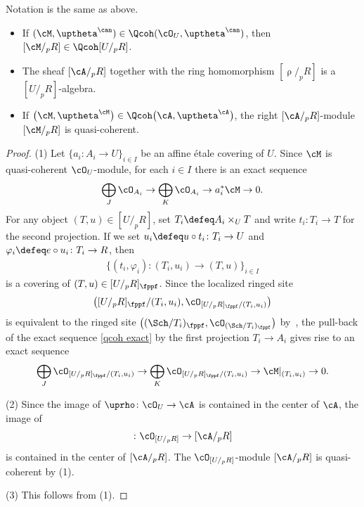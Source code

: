 \begin{lem}\label{qcoh qcoh} Notation is the same as above.
\begin{itemize}\itemsep=0pt
\item[$1.$] If $(\cM,\uptheta^{\can})\in \Qcoh(\cO_U,\uptheta^{\can})$, then $[\cM/_pR]\in \Qcoh[U/_pR]$.
\item[$2.$] The sheaf $[\cA/_pR]$ together with the ring homomorphism $[\uprho/_pR]$ is a $[U/_pR]$-algebra.
\item[$3.$] If $\big(\cM,\uptheta^{\cM}\big)\in \Qcoh\big(\cA,\uptheta^{\cA}\big)$, the right $[\cA/_pR]$-module $[\cM/_pR]$ is quasi-coherent.
\end{itemize}
\begin{proof}
(1) Let $\{a_i\colon A_i\to U\}_{i\in I}$ be an affine \'etale covering of $U$. Since $\cM$ is quasi-coherent $\cO_U$-module, for each $i\in I$ there is an exact sequence
\begin{equation}\label{qcoh exact}
\bigoplus_{J}\cO_{A_i}\to \bigoplus_{K}\cO_{A_i}\to a_i^*\cM\to 0.
\end{equation}
For any object $(T,u)\in [U/_pR]$, set $T_i\defeq A_i\times_{U}T$ and write $t_i\colon T_i\to T$ for the second projection. If we set $u_i\defeq u\circ t_i\colon T_i\to U$ and $\varphi_i\defeq e\circ u_i\colon T_i\to R$, then
\begin{gather*}
\bigl\{(t_i,\varphi_i)\colon (T_i, u_i)\to (T,u)\bigr\}_{i\in I}
\end{gather*}
is a covering of $(T,u)\in [U/_pR]_{\fppf}$. Since the localized ringed site
\begin{gather*}
\big([U/_pR]_{\fppf}/(T_i,u_i),\cO_{[U/_pR]_{\fppf}/(T_i,u_i)}\big)
\end{gather*}
is equivalent to the ringed site $\big(({\Sch/T_i})_{\fppf},\cO_{({\Sch/T_i})_{\fppf}}\big)$ by~\cite[Lemma~9.4; 06W9]{stacks}, the pull-back of the exact sequence \eqref{qcoh exact} by the first projection $T_i\to A_i$ gives rise to an exact sequence
\begin{gather*}
\bigoplus_{J}\cO_{[U/_pR]_{\fppf}/(T_i,u_i)}\to \bigoplus_{K}\cO_{[U/_pR]_{\fppf}/(T_i,u_i)}\to \cM|_{(T_i,u_i)}\to 0.
\end{gather*}

(2) Since the image of $\uprho\colon \cO_U\to \cA$ is contained in the center of $\cA$, the image of \begin{gather*}[\uprho/_pR]\colon \cO_{[U/_pR]}\to [\cA/_pR]\end{gather*} is contained in the center of $[\cA/_pR]$. The $\cO_{[U/_pR]}$-module $[\cA/_pR]$ is quasi-coherent by (1).

(3) This follows from (1).
\end{proof}
\end{lem}

